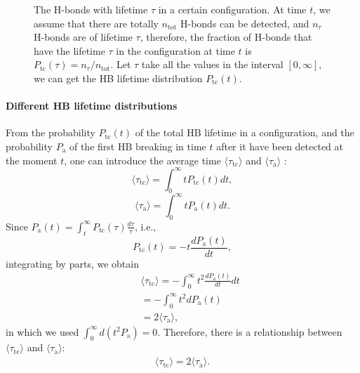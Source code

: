 {\begin{figure}
  \caption{\label{fig:P_tc} The H-bonds with lifetime $\tau$ in a certain configuration. 
At time $t$, we assume that there are totally $n_\text{tot}$ H-bonds can be detected, and $n_{\tau}$ H-bonds are of lifetime $\tau$, therefore,  the fraction of H-bonds that 
have the lifetime $\tau$ in the configuration at time $t$ is $P_\text{tc}(\tau) =  n_{\tau} /n_\text{tot}$.
Let $\tau$ take all the values in the interval $[0,\infty]$, we can get the HB lifetime distribution $P_\text{tc}(t)$.
}
\end{figure}

\paragraph{Different HB lifetime distributions}\label{diff_distr}
From the probability $P_\text{tc}(t)$ of the total HB lifetime in a configuration, and the probability $P_\text{a}$ of 
the first HB breaking in time $t$ after it have been detected at the moment $t$, one can introduce the average time 
$\langle \tau_\text{tc}\rangle$ and $\langle \tau_\text{a}\rangle$ :
\begin{equation}
\langle \tau_\text{tc}\rangle = \int_0^\infty t P_\text{tc}(t) dt,
\label{eq:tau_tc}
\end{equation}
\begin{equation}
\langle \tau_\text{a}\rangle = \int_0^\infty t P_\text{a}(t) dt. 
\label{eq:tau_a}
\end{equation}
Since $P_{\mathrm{a}}(t)=\int_{t}^{\infty} P_{\mathrm{tc}}(\tau) \frac{d \tau}{\tau}$, i.e., 
\begin{equation}
P_\text{tc}(t) = -t\frac{dP_\text{a}(t)}{dt}, \nonumber
\label{eq:relation_Ptc--Pa}
\end{equation}
integrating by parts, we obtain
\begin{eqnarray}
&&\langle \tau_\text{tc}\rangle = -\int_0^\infty t^2 \frac{dP_{\mathrm{a}}(t)}{dt}dt \nonumber \\
&&= -\int_0^\infty t^2 dP_\text{a}(t) \nonumber\\
&&= 2\langle \tau_\text{a}\rangle,\nonumber
\end{eqnarray}
in which we used $\int_0^\infty d(t^2 P_\text{a})=0$.
Therefore, there is a relationship between $\langle \tau_\text{tc} \rangle$ and $\langle \tau_\text{a} \rangle$:
\begin{eqnarray}
\langle \tau_\text{tc}\rangle = 2\langle \tau_\text{a}\rangle.
\label{eq:relation_tau_tc--t_a}
\end{eqnarray}

}

